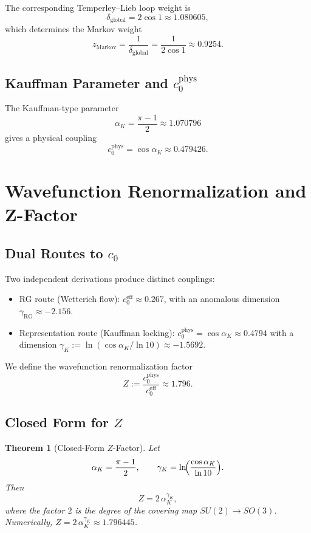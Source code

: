 \documentclass[11pt]{article}
\newtheorem{theorem}{Theorem}[section]
\theoremstyle{remark}
\begin{document}
The corresponding Temperley--Lieb loop weight is
\[
  \delta_{\text{global}} = 2\cos 1 \approx 1.080605,
\]
which determines the Markov weight
\[
  z_{\text{Markov}} = \frac{1}{\delta_{\text{global}}}
  = \frac{1}{2\cos 1} \approx 0.9254.
\]

\subsection{Kauffman Parameter and $c_0^{\text{phys}}$}

The Kauffman-type parameter
\[
  \alpha_K = \frac{\pi-1}{2} \approx 1.070796
\]
gives a physical coupling
\[
  c_0^{\text{phys}} = \cos\alpha_K \approx 0.479426.
\]

\section{Wavefunction Renormalization and Z-Factor}

\subsection{Dual Routes to $c_0$}

Two independent derivations produce distinct couplings:

\begin{itemize}[leftmargin=*]
  \item RG route (Wetterich flow): $c_0^{\text{eff}} \approx 0.267$, with an
        anomalous dimension $\gamma_{\text{RG}} \approx -2.156$.
  \item Representation route (Kauffman locking):
        $c_0^{\text{phys}} = \cos\alpha_K \approx 0.4794$ with a
        dimension $\gamma_K := \ln(\cos\alpha_K/\ln 10)\approx-1.5692$.
\end{itemize}

We define the wavefunction renormalization factor
\[
  Z := \frac{c_0^{\text{phys}}}{c_0^{\text{eff}}} \approx 1.796.
\]

\subsection{Closed Form for $Z$}

\begin{theorem}[Closed-Form $Z$-Factor]
Let
\[
  \alpha_K = \frac{\pi-1}{2},\qquad
  \gamma_K = \ln\!\Bigl(\frac{\cos\alpha_K}{\ln 10}\Bigr).
\]
Then
\[
  Z = 2\,\alpha_K^{\gamma_K},
\]
where the factor $2$ is the degree of the covering map $SU(2)\to SO(3)$.
Numerically, $Z = 2\,\alpha_K^{\gamma_K} \approx 1.796445$.
\end{theorem}
\end{document}

